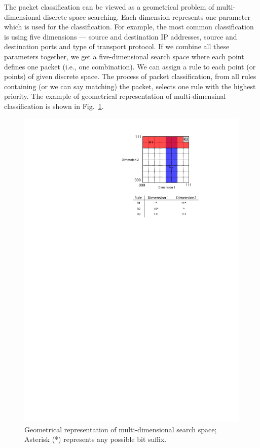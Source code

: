 The packet classification can be viewed as a geometrical problem of multi-dimensional discrete space searching. 
Each dimension represents one parameter which is used for the classification. 
For example, the most common classification is using five dimensions --- source and destination IP 
addresses, source and destination ports and type of transport protocol. If we combine all these parameters together, we get a 
five-dimensional search space where each point defines one packet (i.e., one combination). 
We can assign a rule to each point (or points) of given discrete space. 
The process of packet classification, from all rules containing (or we can say matching) the packet, selects one rule with the highest priority. 
The example of geometrical representation of multi-dimensinal classification is shown in Fig.~\ref{fig:GeometricRepresentationOfMultiSearchSpace}.

\begin{figure}[t]
    \centering
    \includegraphics[scale=1.2]{chapters/pic/SearchSpaceExample}
    \caption{Geometrical representation of multi-dimensional search space; Asterisk (*) represents any possible bit suffix.}
    \label{fig:GeometricRepresentationOfMultiSearchSpace}
\end{figure}

